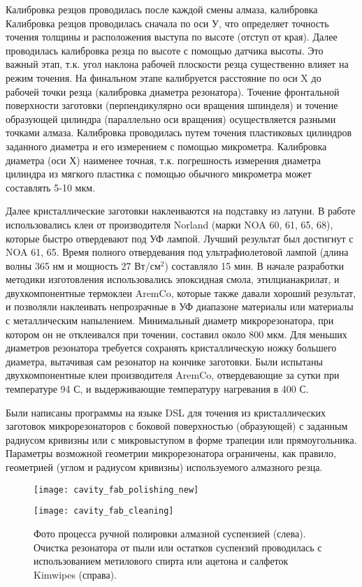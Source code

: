Калибровка резцов проводилась после каждой смены алмаза, калибровка Калибровка резцов проводилась сначала по оси У, что определяет точность точения толщины и расположения выступа по высоте (отступ от края). Далее проводилась калибровка резца по высоте с помощью датчика высоты. Это важный этап, т.к. угол наклона рабочей плоскости резца существенно влияет на режим точения. На финальном этапе калибруется расстояние по оси X до рабочей точки резца (калибровка диаметра резонатора). Точение фронтальной поверхности заготовки (перпендикулярно оси вращения шпинделя) и точение образующей цилиндра (параллельно оси вращения) осуществляется разными точками алмаза. Калибровка проводилась путем точения пластиковых цилиндров заданного диаметра и его измерением с помощью микрометра. Калибровка диаметра (оси Х) наименее точная, т.к. погрешность измерения диаметра цилиндра из мягкого пластика с помощью обычного микрометра может составлять 5-10 мкм.

Далее кристаллические заготовки наклеиваются на подставку из латуни. В работе использовались клеи от производителя Norland (марки NOA 60, 61, 65, 68), которые быстро отвердевают под УФ лампой. Лучший результат был достигнут с NOA 61, 65. Время полного отвердевания под ультрафиолетовой лампой (длина волны 365 нм и мощность 27 Вт/см$^2$) составляло 15 мин. В начале разработки методики изготовления использовались эпоксидная смола, этилцианакрилат, и двухкомпонентные термоклеи AremCo, которые также давали хороший результат, и позволяли наклеивать непрозрачные в УФ диапазоне материалы или материалы с металлическим напылением. Минимальный диаметр микрорезонатора, при котором он не отклеивался при точении, составил около 800 мкм. Для меньших диаметров резонатора требуется сохранять кристаллическую ножку большего диаметра, вытачивая сам резонатор на кончике заготовки. Были испытаны двухкомпонентные клеи производителя AremCo, отвердевающие за сутки при температуре 94 С, и выдерживающие температуру нагревания в 400 С.

Были написаны программы на языке DSL для точения из кристаллических заготовок микрорезонаторов с боковой поверхностью (образующей) с заданным радиусом кривизны или с микровыступом в форме трапеции или прямоугольника. Параметры возможной геометрии микрорезонатора ограничены, как правило, геометрией (углом и радиусом кривизны) используемого алмазного резца.


\begin{figure}[ht]
  \begin{minipage}[ht]{0.49\linewidth}\centering
    \texttt{[image: cavity\_fab\_polishing\_new]}
  \end{minipage}
  \hfill
  \begin{minipage}[ht]{0.49\linewidth}\centering
    \texttt{[image: cavity\_fab\_cleaning]}
  \end{minipage}
  \caption{Фото процесса ручной полировки алмазной суспензией (слева). Очистка резонатора от пыли или остатков суспензий проводилась с использованием метилового спирта или ацетона и салфеток Kimwipes (справа).}
  \label{cavity_fab}
\end{figure}

